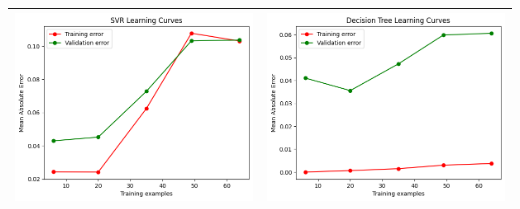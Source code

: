 \begin{table}[H]
    \centering
    \footnotesize
    \setlength\tabcolsep{0pt}
    \begin{tabularx}{\textwidth}{|X|X|}
        \hline
        \includegraphics[width=\linewidth, trim=0 0 0 0]{images/SVR_lc80_Azure.png} &
        \includegraphics[width=\linewidth, trim=0 0 0 0]{images/DecisionTree_lc80_Azure.png} \\
        \hline

\end{tabularx}
\end{table}

